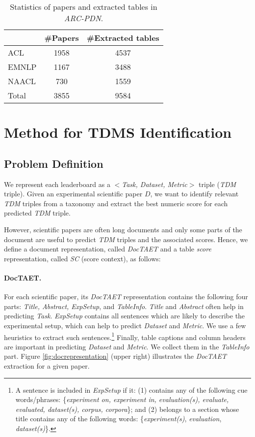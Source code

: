 \documentclass[11pt,a4paper]{article}
\begin{document}
\begin{table}[t]
\begin{center}
\begin{tabular}{lcc}
&\#Papers&\#Extracted tables \\ \hline
 ACL&1958&4537\\ \hline 
 EMNLP&1167&3488\\ \hline 
 NAACL&730&1559\\ \hline 
 Total&3855&9584\\ \hline 
\end{tabular}
\end{center}
\caption{\label{tab:ds2}  Statistics of papers and extracted tables in \emph{ARC-PDN}.}
\end{table}



\section{Method for TDMS Identification}
\label{sec:method}



\subsection{Problem Definition}
\label{sec:problemDef}
We represent each leaderboard as a $<$\emph{Task, Dataset, Metric}$>$ triple (\emph{TDM} triple). Given an experimental scientific paper $D$, we
want to identify relevant \emph{TDM} triples from a taxonomy and extract the best numeric score for each predicted \emph{TDM} triple.
 
However, scientific papers are often long documents and only some parts of the document are useful to predict \emph{TDM} triples and the associated scores. 
Hence, we define a document representation, called  \emph{DocTAET} and a table \textit{score} representation, called \emph{SC} (score context), as follows:

\paragraph{DocTAET.} For each scientific paper, its \emph{DocTAET} representation contains the following four parts: \emph{Title, Abstract, ExpSetup}, and \emph{TableInfo}.
\emph{Title} and \emph{Abstract} often help in predicting \emph{Task}. \emph{ExpSetup} contains all sentences which are likely to describe the experimental setup, which can help to predict \emph{Dataset} and \emph{Metric}. We use a few 
heuristics to extract such sentences.\footnote{A sentence is included in \emph{ExpSetup} if it: (1) contains any of the following cue words/phrases:
\{\emph{experiment on, experiment in, evaluation(s), evaluate, evaluated, dataset(s), corpus, corpora}\}; and (2) belongs to a section whose title contains any of the following words: \{\emph{experiment(s)}, \emph{evaluation}, \emph{dataset(s)}\}.}
Finally, table captions and column headers are important in predicting \emph{Dataset} and \emph{Metric}. We collect them in the \emph{TableInfo} part. 
Figure \ref{fig:docrepresentation} (upper right) illustrates the \emph{DocTAET} extraction for a given paper.
\end{document}
